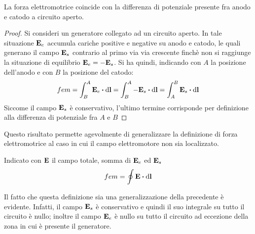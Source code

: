 \begin{thm}
    La forza elettromotrice coincide con la differenza di potenziale presente fra anodo e catodo a circuito aperto.
\end{thm}
\begin{proof}
    Si consideri un generatore collegato ad un circuito aperto. In tale situazione $\vb{E}_e$
    accumula cariche positive e negative su anodo e catodo, le quali generano il campo $\vb{E}_s$ contrario al primo
    via via crescente finchè non si raggiunge la situazione di equilibrio $\vb{E}_e=-\vb{E}_s$.
    Si ha quindi, indicando con $A$ la posizione dell'anodo e con $B$ la posizione del catodo:
    \[
        fem=\int_B^A\vb{E}_e\vdot \dd{\vb{l}}=\int_B^A-\vb{E}_s\vdot \dd{\vb{l}}=\int_A^B\vb{E}_s\vdot \dd{\vb{l}}
    \]
    Siccome il campo $\vb{E}_s$ è conservativo, l'ultimo termine corrisponde per definizione alla differenza di potenziale fra $A$ e $B$
\end{proof}
Questo risultato permette agevolmente di generalizzare la definizione di forza elettromotrice al caso in cui il
campo elettromotore non sia localizzato.
\begin{defn}
    Indicato con $\vb{E}$ il campo totale, somma di $\vb{E}_e$ ed $\vb{E}_s$
    \[
        fem=\oint \vb{E} \vdot \dd{\vb{l}}
    \]
\end{defn}
Il fatto che questa definizione sia una generalizzazione della precedente è evidente.
Infatti, il campo $\vb{E}_s$ è conservativo e quindi il suo integrale su tutto il circuito è nullo;
inoltre il campo $\vb{E}_e$ è nullo su tutto il circuito ad eccezione della zona in cui è presente il generatore.

